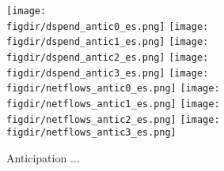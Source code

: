 \begin{figure}[H]
    \centering
    \caption{Anticipation ...}%
    \label{fig:new}
    \texttt{[image: \\figdir/dspend\_antic0\_es.png]}
    \texttt{[image: \\figdir/dspend\_antic1\_es.png]}
    \texttt{[image: \\figdir/dspend\_antic2\_es.png]}
    \texttt{[image: \\figdir/dspend\_antic3\_es.png]}
    \texttt{[image: \\figdir/netflows\_antic0\_es.png]}
    \texttt{[image: \\figdir/netflows\_antic1\_es.png]}
    \texttt{[image: \\figdir/netflows\_antic2\_es.png]}
    \texttt{[image: \\figdir/netflows\_antic3\_es.png]}
\end{figure}





